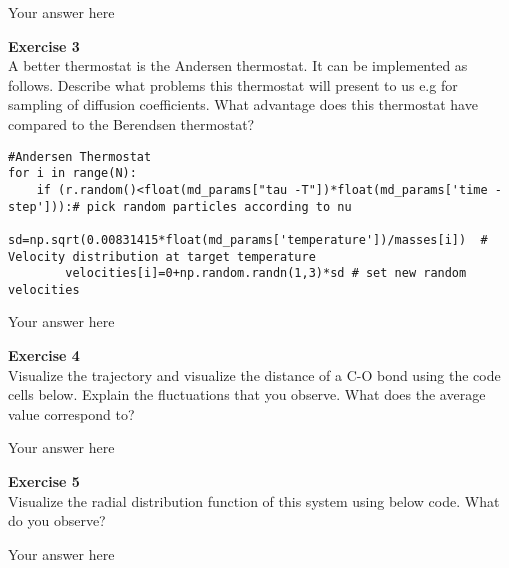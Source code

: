 \documentclass{article}
\begin{document}
Your answer here

\begin{mdframed}
\textbf{Exercise 3}\\
A better thermostat is the Andersen thermostat. It can be implemented as follows. Describe what problems this thermostat will present to us e.g for sampling of diffusion coefficients. What advantage does this thermostat have compared to the Berendsen thermostat?

\begin{verbatim}
#Andersen Thermostat
for i in range(N):
    if (r.random()<float(md_params["tau -T"])*float(md_params['time -step'])):# pick random particles according to nu
        sd=np.sqrt(0.00831415*float(md_params['temperature'])/masses[i])  # Velocity distribution at target temperature
        velocities[i]=0+np.random.randn(1,3)*sd # set new random velocities
\end{verbatim}
\end{mdframed}

Your answer here

\begin{mdframed}
\textbf{Exercise 4}\\
Visualize the trajectory and visualize the distance of a C-O bond using the code cells below.
Explain the fluctuations that you observe. What does the average value correspond to?
\end{mdframed}

Your answer here

\begin{mdframed}
\textbf{Exercise 5}\\
Visualize the radial distribution function of this system using below code. What do you observe?
\end{mdframed}

Your answer here
\end{document}
